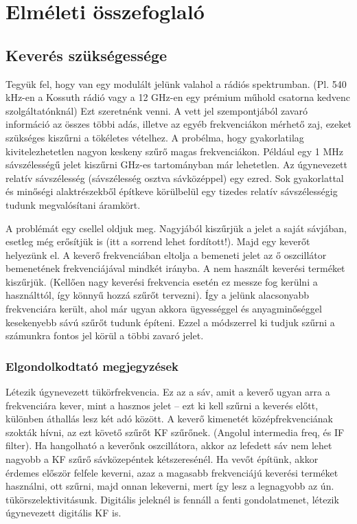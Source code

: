 \documentclass[12pt,a4paper]{article}
\begin{document}
\section{Elméleti összefoglaló}
\subsection{Keverés szükségessége}
Tegyük fel, hogy van egy modulált jelünk valahol a rádiós spektrumban. (Pl. 540 kHz-en a Kossuth rádió vagy a 12 GHz-en egy prémium műhold csatorna kedvenc szolgáltatónknál) Ezt szeretnénk venni. A vett jel szempontjából zavaró információ az összes többi adás, illetve az egyéb frekvenciákon mérhető zaj, ezeket szükséges kiszűrni a tökéletes vételhez. A probélma, hogy gyakorlatilag kivitelezhetetlen nagyon keskeny szűrő magas frekvenciákon. Például egy 1 MHz sávszélességű jelet kiszűrni GHz-es tartományban már lehetetlen. Az úgynevezett relatív sávszélesség (sávszélesség osztva sávközéppel) egy ezred. Sok gyakorlattal és minőségi alaktrészekből építkeve körülbelül egy tizedes relatív sávszélességig tudunk megvalósítani áramkört.\par
A problémát egy csellel oldjuk meg. Nagyjából kiszűrjük a jelet a saját sávjában, esetleg még erősítjük is (itt a sorrend lehet fordított!). Majd egy keverőt helyezünk el. A keverő frekvenciában eltolja a bemeneti jelet az ő oszcillátor bemenetének frekvenciájával mindkét irányba. A nem használt keverési terméket kiszűrjük. (Kellően nagy keverési frekvencia esetén ez messze fog kerülni a használttól, így könnyű hozzá szűrőt tervezni). Így a jelünk alacsonyabb frekvenciára került, ahol már ugyan akkora ügyességgel és anyagminőséggel kesekenyebb sávú szűrőt tudunk építeni. Ezzel a módszerrel ki tudjuk szűrni a számunkra fontos jel körül a többi zavaró jelet.
\subsubsection{Elgondolkodtató megjegyzések}
Létezik úgynevezett tükörfrekvencia. Ez az a sáv, amit a keverő ugyan arra a frekvenciára kever, mint a hasznos jelet -- ezt ki kell szűrni a keverés előtt, különben áthallás lesz két adó között. A keverő kimenetét középfrekvenciának szokták hívni, az ezt követő szűrőt KF szűrőnek. (Angolul intermedia freq, és IF filter). Ha hangolható a keverőnk oszcillátora, akkor az lefedett sáv nem lehet nagyobb a KF szűrő sávközepéntek kétszeresénél. Ha vevőt építünk, akkor érdemes először felfele keverni, azaz a magasabb frekvenciájú keverési terméket használni, ott szűrni, majd onnan lekeverni, mert így lesz a legnagyobb az ún. tükörszelektivitásunk. Digitális jeleknél is fennáll a fenti gondolatmenet, létezik úgynevezett digitális KF is.
\end{document}

